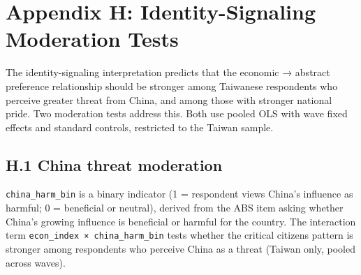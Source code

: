 \documentclass[
  12pt,
  letterpaper]{article}
\begin{document}
\section{Appendix H: Identity-Signaling Moderation
Tests}\label{appendix-h-identity-signaling-moderation-tests}

The identity-signaling interpretation predicts that the economic →
abstract preference relationship should be stronger among Taiwanese
respondents who perceive greater threat from China, and among those with
stronger national pride. Two moderation tests address this. Both use
pooled OLS with wave fixed effects and standard controls, restricted to
the Taiwan sample.

\subsection{H.1 China threat
moderation}\label{h.1-china-threat-moderation}

\texttt{china\_harm\_bin} is a binary indicator (1 = respondent views
China's influence as harmful; 0 = beneficial or neutral), derived from
the ABS item asking whether China's growing influence is beneficial or
harmful for the country. The interaction term
\texttt{econ\_index\ ×\ china\_harm\_bin} tests whether the critical
citizens pattern is stronger among respondents who perceive China as a
threat (Taiwan only, pooled across waves).

\begin{table}

\caption{\label{tbl-china-mod}China threat moderation:
econ\(\times\)China-harm on democratic support (Taiwan)}


\end{table}%
\end{document}
